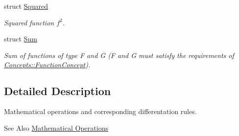 \begin{DoxyCompactItemize}
struct \hyperlink{structFunG_1_1MathematicalOperations_1_1Squared}{Squared}
\begin{DoxyCompactList}\small\item\em Squared function $f^2$. \end{DoxyCompactList}\item 
struct \hyperlink{structFunG_1_1MathematicalOperations_1_1Sum}{Sum}
\begin{DoxyCompactList}\small\item\em Sum of functions of type F and G (F and G must satisfy the requirements of \hyperlink{structFunG_1_1Concepts_1_1FunctionConcept}{Concepts\-::\-Function\-Concept}). \end{DoxyCompactList}\end{DoxyCompactItemize}


\subsection{Detailed Description}
Mathematical operations and corresponding differentation rules. \begin{DoxySeeAlso}{See Also}
\hyperlink{group__MathematicalOperationsGroup}{Mathematical Operations} 
\end{DoxySeeAlso}
